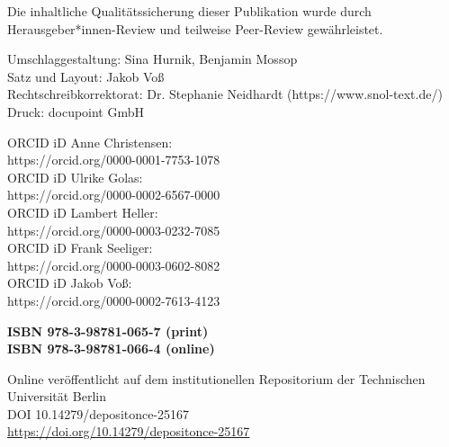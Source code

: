 \documentclass[
  11pt,
  letterpaper,
  DIV=11,
  twoside]{scrreprt}
\begin{document}
Die inhaltliche Qualitätssicherung dieser Publikation wurde durch
Herausgeber*innen-Review und teilweise Peer-Review gewährleistet.

Umschlaggestaltung: Sina Hurnik, Benjamin Mossop\\
Satz und Layout: Jakob Voß\\
Rechtschreibkorrektorat: Dr. Stephanie Neidhardt
(https://www.snol-text.de/)\\
Druck: docupoint GmbH

ORCID iD Anne Christensen:\\
https://orcid.org/0000-0001-7753-1078\\
ORCID iD Ulrike Golas:\\
https://orcid.org/0000-0002-6567-0000\\
ORCID iD Lambert Heller:\\
https://orcid.org/0000-0003-0232-7085\\
ORCID iD Frank Seeliger:\\
https://orcid.org/0000-0003-0602-8082\\
ORCID iD Jakob Voß:\\
https://orcid.org/0000-0002-7613-4123

\textbf{ISBN 978-3-98781-065-7 (print)}\\
\textbf{ISBN 978-3-98781-066-4 (online)}

Online veröffentlicht auf dem institutionellen Repositorium der
Technischen Universität Berlin\\
DOI 10.14279/depositonce-25167\\
\url{https://doi.org/10.14279/depositonce-25167}

\clearpage
\thispagestyle{empty}\mbox{}
\end{document}
